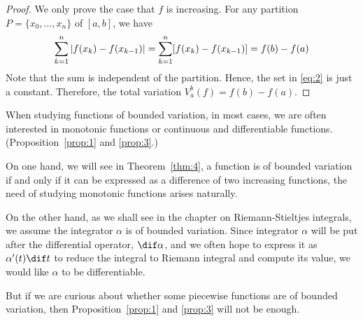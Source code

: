 \documentclass[thmcnt=section, color=blue, 12pt]{my-elegantbook}
\begin{document}
\begin{proof}
	We only prove the case that $f$ is increasing.
	For any partition $P = \{x_0, \dots, x_n\}$ of $[a, b]$, we have
	\begin{align*}
		\sum_{k=1}^n \left\lvert f(x_k) - f(x_{k-1}) \right\rvert
		= \sum_{k=1}^n [f(x_k) - f(x_{k-1})]
		= f(b) - f(a)
	\end{align*}
	Note that the sum is independent of the partition.
	Hence, the set in \eqref{eq:2} is just a constant.
	Therefore, the total variation $V_a^b(f) = f(b) - f(a)$.
\end{proof}

When studying functions of bounded variation,
in most cases, we are often interested in
monotonic functions
or continuous and differentiable functions.
(Proposition~\ref{prop:1} and \ref{prop:3}.)

\begin{note}
	On one hand, we will see in Theorem~\ref{thm:4},
	a function is of bounded variation if and only if
	it can be expressed as a difference
	of two increasing functions,
	the need of studying monotonic functions arises naturally.

	On the other hand, as we shall see in the chapter on Riemann-Stieltjes integrals,
	we assume the integrator $\alpha$ is of bounded variation.
	Since integrator $\alpha$ will be put after the
	differential operator, $\dif \alpha$,
	and we often hope to express it as $\alpha^\prime(t) \dif t$
	to reduce the integral to Riemann integral
	and compute its value,
	we would like $\alpha$ to be differentiable.
\end{note}

But if we are curious about whether some piecewise functions
are of bounded variation,
then Proposition~\ref{prop:1} and \ref{prop:3} will not be enough.
\end{document}
